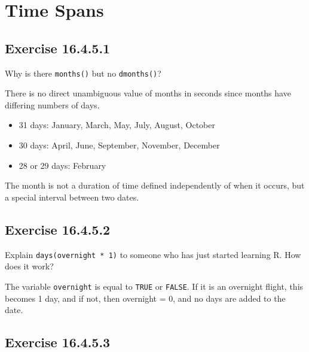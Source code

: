 \documentclass[]{book}
\providecommand{\tightlist}{%
  \setlength{\itemsep}{0pt}\setlength{\parskip}{0pt}}
\theoremstyle{plain}
\theoremstyle{remark}
\begin{document}
\hypertarget{time-spans}{%
\section{Time Spans}\label{time-spans}}

\hypertarget{exercise-16.4.5.1}{%
\subsection*{\texorpdfstring{Exercise
{16.4.5.1}}{Exercise 16.4.5.1}}\label{exercise-16.4.5.1}}

Why is there \texttt{months()} but no \texttt{dmonths()}?

There is no direct unambiguous value of months in seconds since months
have differing numbers of days.

\begin{itemize}
\tightlist
\item
  31 days: January, March, May, July, August, October
\item
  30 days: April, June, September, November, December
\item
  28 or 29 days: February
\end{itemize}

The month is not a duration of time defined independently of when it
occurs, but a special interval between two dates.

\hypertarget{exercise-16.4.5.2}{%
\subsection*{\texorpdfstring{Exercise
{16.4.5.2}}{Exercise 16.4.5.2}}\label{exercise-16.4.5.2}}

Explain \texttt{days(overnight\ *\ 1)} to someone who has just started
learning R. How does it work?

The variable \texttt{overnight} is equal to \texttt{TRUE} or
\texttt{FALSE}. If it is an overnight flight, this becomes 1 day, and if
not, then overnight = 0, and no days are added to the date.

\hypertarget{exercise-16.4.5.3}{%
\subsection*{\texorpdfstring{Exercise
{16.4.5.3}}{Exercise 16.4.5.3}}\label{exercise-16.4.5.3}}
\end{document}
